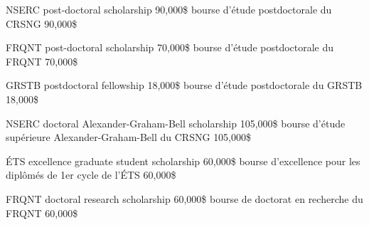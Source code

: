 \documentclass[print]{friggeri-cv}
\begin{document}

\begin{entrylist}

  \engfr
  { {{\small NSERC} post-doctoral scholarship} {90,000\$} {\vspace{-3mm}}}
  { {bourse d’étude postdoctorale du {\small CRSNG}} {90,000\$} {\vspace{-3mm}}}

  \engfr
  { {{\small FRQNT} post-doctoral scholarship} {70,000\$} {\vspace{-3mm}}}
  { {bourse d’étude postdoctorale du {\small FRQNT}} {70,000\$} {\vspace{-3mm}}}

  \engfr
  { {{\small GRSTB} postdoctoral fellowship} {18,000\$} {\vspace{-3mm}}}
  { {bourse d’étude postdoctorale du {\small GRSTB}} {18,000\$} {\vspace{-3mm}}}


  \engfr
  { {{\small NSERC} doctoral Alexander-Graham-Bell scholarship} {105,000\$} {\vspace{-3mm}}}
  { {bourse d’étude supérieure Alexander-Graham-Bell du {\small CRSNG}} {105,000\$} {\vspace{-3mm}}}

  \engfr
  { {{\small ÉTS} excellence graduate student scholarship} {60,000\$} {\vspace{-3mm}}}
  { {bourse d'excellence pour les diplômés de 1er cycle de l'ÉTS} {60,000\$} {\vspace{-3mm}}}

  \engfr
  { {{\small FRQNT} doctoral research scholarship} {60,000\$} {\vspace{-3mm}}}
  { {bourse de doctorat en recherche du {\small FRQNT}} {60,000\$} {\vspace{-3mm}}}


\end{entrylist}
\end{document}
